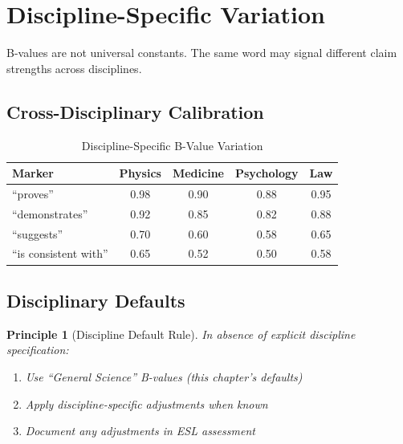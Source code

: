 \documentclass[11pt,a4paper]{article}
\newtheorem{principle}{Principle}[section]
\theoremstyle{remark}
\begin{document}

\section{Discipline-Specific Variation}
\label{sec:discipline-variation}

B-values are not universal constants. The same word may signal different claim strengths across disciplines.

\subsection{Cross-Disciplinary Calibration}

\begin{table}[h]
\centering
\caption{Discipline-Specific B-Value Variation}
\label{tab:discipline-b}
\begin{tabular}{lcccc}
\toprule
\textbf{Marker} & \textbf{Physics} & \textbf{Medicine} & \textbf{Psychology} & \textbf{Law} \\
\midrule
``proves'' & 0.98 & 0.90 & 0.88 & 0.95 \\
``demonstrates'' & 0.92 & 0.85 & 0.82 & 0.88 \\
``suggests'' & 0.70 & 0.60 & 0.58 & 0.65 \\
``is consistent with'' & 0.65 & 0.52 & 0.50 & 0.58 \\
\bottomrule
\end{tabular}
\end{table}

\subsection{Disciplinary Defaults}

\begin{principle}[Discipline Default Rule]
\label{princ:discipline-default}
In absence of explicit discipline specification:
\begin{enumerate}
    \item Use ``General Science'' B-values (this chapter's defaults)
    \item Apply discipline-specific adjustments when known
    \item Document any adjustments in ESL assessment
\end{enumerate}
\end{principle}
\end{document}
